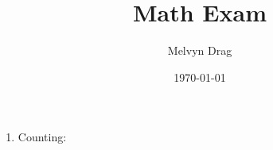 \documentclass{article}
\title{\textbf{Math Exam}}
\author{
Melvyn Drag
}
\date{\today}
\begin{document}
\maketitle

\subsection{  }	
\begin{enumerate}
	  \item Counting: 
\end{enumerate}
\end{document}
